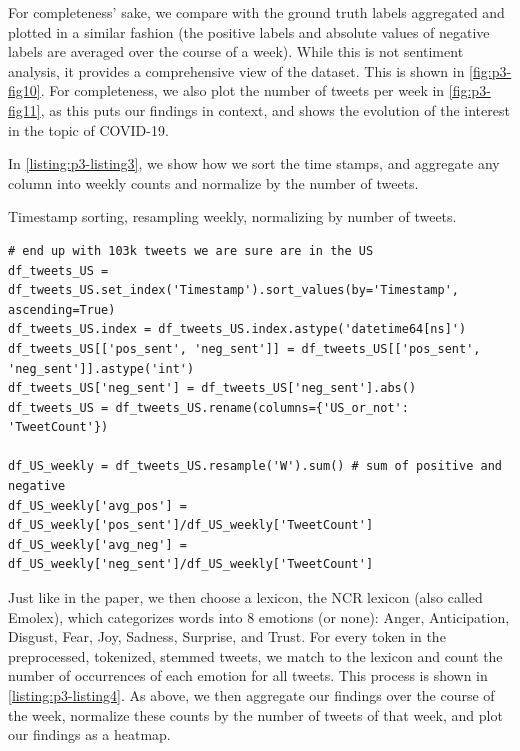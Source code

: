 For completeness’ sake, we compare with the ground truth labels aggregated and plotted in a similar fashion (the positive labels and absolute values of negative labels are averaged over the course of a week). While this is not sentiment analysis, it provides a comprehensive view of the dataset. This is shown in \cref{fig:p3-fig10}. For completeness, we also plot the number of tweets per week in \cref{fig:p3-fig11}, as this puts our findings in context, and shows the evolution of the interest in the topic of COVID-19.

In \cref{listing:p3-listing3}, we show how we sort the time stamps, and aggregate any column into weekly counts and normalize by the number of tweets.

\begin{listing*}
\caption{Timestamp sorting, resampling weekly, normalizing by number of tweets.}
\begin{verbatim}
# end up with 103k tweets we are sure are in the US
df_tweets_US = df_tweets_US.set_index('Timestamp').sort_values(by='Timestamp', ascending=True)
df_tweets_US.index = df_tweets_US.index.astype('datetime64[ns]')
df_tweets_US[['pos_sent', 'neg_sent']] = df_tweets_US[['pos_sent', 'neg_sent']].astype('int')
df_tweets_US['neg_sent'] = df_tweets_US['neg_sent'].abs()
df_tweets_US = df_tweets_US.rename(columns={'US_or_not': 'TweetCount'})

df_US_weekly = df_tweets_US.resample('W').sum() # sum of positive and negative
df_US_weekly['avg_pos'] = df_US_weekly['pos_sent']/df_US_weekly['TweetCount']
df_US_weekly['avg_neg'] = df_US_weekly['neg_sent']/df_US_weekly['TweetCount']
\end{verbatim}
\label{listing:p3-listing3}
\end{listing*}

Just like in the paper, we then choose a lexicon, the NCR lexicon (also called Emolex), which categorizes words into 8 emotions (or none): Anger, Anticipation, Disgust, Fear, Joy, Sadness, Surprise, and Trust. For every token in the preprocessed, tokenized, stemmed tweets, we match to the lexicon and count the number of occurrences of each emotion for all tweets. This process is shown in \cref{listing:p3-listing4}. As above, we then aggregate our findings over the course of the week, normalize these counts by the number of tweets of that week, and plot our findings as a heatmap.

